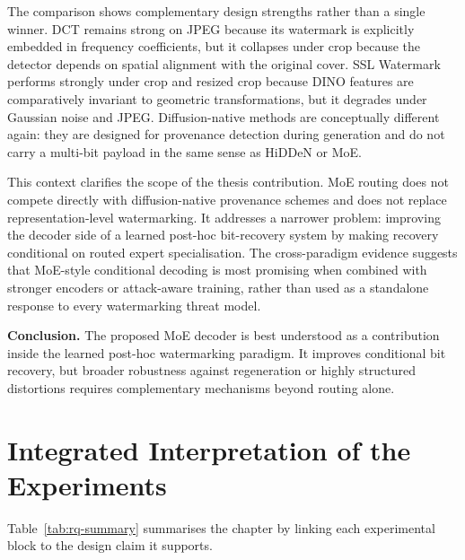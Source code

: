 ﻿\documentclass[12pt, a4paper, twoside]{report}
\numberwithin{equation}{chapter}
\begin{document}
The comparison shows complementary design strengths rather than a single winner. DCT remains strong on JPEG because its watermark is explicitly embedded in frequency coefficients, but it collapses under crop because the detector depends on spatial alignment with the original cover. SSL Watermark performs strongly under crop and resized crop because DINO features are comparatively invariant to geometric transformations, but it degrades under Gaussian noise and JPEG. Diffusion-native methods are conceptually different again: they are designed for provenance detection during generation and do not carry a multi-bit payload in the same sense as HiDDeN or MoE.

This context clarifies the scope of the thesis contribution. MoE routing does not compete directly with diffusion-native provenance schemes and does not replace representation-level watermarking. It addresses a narrower problem: improving the decoder side of a learned post-hoc bit-recovery system by making recovery conditional on routed expert specialisation. The cross-paradigm evidence suggests that MoE-style conditional decoding is most promising when combined with stronger encoders or attack-aware training, rather than used as a standalone response to every watermarking threat model.

\textbf{Conclusion.} The proposed MoE decoder is best understood as a contribution inside the learned post-hoc watermarking paradigm. It improves conditional bit recovery, but broader robustness against regeneration or highly structured distortions requires complementary mechanisms beyond routing alone.

\section{Integrated Interpretation of the Experiments}
\label{sec:summary}

Table~\ref{tab:rq-summary} summarises the chapter by linking each experimental block to the design claim it supports.
\end{document}
